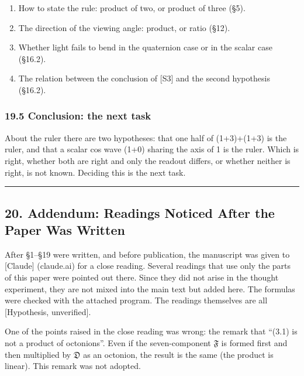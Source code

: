 \documentclass[
  a4paper,
]{article}
\providecommand{\tightlist}{%
  \setlength{\itemsep}{0pt}\setlength{\parskip}{0pt}}
\begin{document}
\begin{enumerate}
\def\labelenumi{\arabic{enumi}.}
\tightlist
\item
  How to state the rule: product of two, or product of three (§5).
\item
  The direction of the viewing angle: product, or ratio (§12).
\item
  Whether light fails to bend in the quaternion case or in the scalar
  case (§16.2).
\item
  The relation between the conclusion of {[}S3{]} and the second
  hypothesis (§16.2).
\end{enumerate}

\subsubsection{19.5 Conclusion: the next
task}\label{conclusion-the-next-task}

About the ruler there are two hypotheses: that one half of (1+3)+(1+3)
is the ruler, and that a scalar cos wave (1+0) sharing the axis of 1 is
the ruler. Which is right, whether both are right and only the readout
differs, or whether neither is right, is not known. Deciding this is the
next task.

\begin{center}\rule{0.5\linewidth}{0.5pt}\end{center}

\subsection{20. Addendum: Readings Noticed After the Paper Was
Written}\label{addendum-readings-noticed-after-the-paper-was-written}

After §1--§19 were written, and before publication, the manuscript was
given to {[}Claude{]} (claude.ai) for a close reading. Several readings
that use only the parts of this paper were pointed out there. Since they
did not arise in the thought experiment, they are not mixed into the
main text but added here. The formulas were checked with the attached
program. The readings themselves are all {[}Hypothesis, unverified{]}.

One of the points raised in the close reading was wrong: the remark that
``(3.1) is not a product of octonions''. Even if the seven-component
\(\mathfrak{F}\) is formed first and then multiplied by \(\mathfrak{D}\)
as an octonion, the result is the same (the product is linear). This
remark was not adopted.
\end{document}
